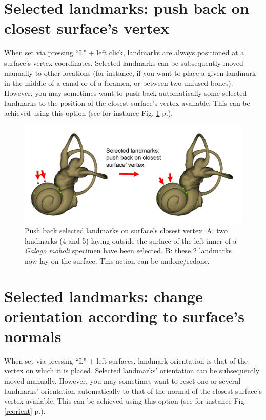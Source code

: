 \section{Selected landmarks: push back on closest surface's vertex}
When set via pressing ``L" + left click, landmarks are always positioned at a surface's vertex coordinates. Selected
landmarks can be subsequently moved manually to other locations (for instance, if you want to place
a given landmark in the middle of a canal or of a foramen, or between two unfused bones). However,
you may sometimes want to push back automatically some selected landmarks to the position of the
closest surface's vertex available. This can be achieved using this option (see for instance Fig. \ref{push_back} p.\pageref{push_back}).

\begin{figure}
  \centering
  \includegraphics[scale=0.27]{images/10/push_back.png} 
	\caption{Push back selected landmarks on surface's closest vertex. A: two landmarks (4 and 5) laying outside the surface of the left inner of a \textit{Galago moholi} specimen have been selected. B: these 2 landmarks now lay on the surface. This action can be undone/redone.}
\label{push_back}
 
\end{figure}


\section{Selected landmarks: change orientation according to surface's normals}
When set via pressing ``L" + left surfaces, landmark orientation is that of the vertex on which it is
placed. Selected landmarks' orientation can be subsequently moved manually. However, you may
sometimes want to reset one or several landmarks' orientation automatically to that of the normal of the closest
surface's vertex available. This can be achieved using this option (see for instance Fig. \ref{reorient} p.\pageref{reorient}).

